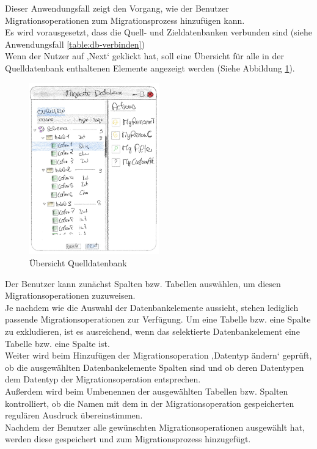 Dieser Anwendungsfall zeigt den Vorgang, wie der Benutzer Migrationsoperationen zum Migrationsprozess hinzufügen kann.\\
Es wird vorausgesetzt, dass die Quell- und Zieldatenbanken verbunden sind (siehe Anwendungsfall \ref{table:db-verbinden})\\
Wenn der Nutzer auf ,Next‘ geklickt hat, soll eine Übersicht für alle in der Quelldatenbank enthaltenen Elemente angezeigt werden (Siehe Abbildung \ref{img:overview}).
\begin{figure}[H]
	\centering
	\includegraphics[width=0.5\textwidth]{images/overview}
	\caption{Übersicht Quelldatenbank}
	\label{img:overview}
\end{figure}
Der Benutzer kann zunächst Spalten bzw. Tabellen auswählen, um diesen Migrationsoperationen zuzuweisen.\\
Je nachdem wie die Auswahl der Datenbankelemente aussieht, stehen lediglich passende Migrationsoperationen zur Verfügung. Um eine Tabelle bzw. eine Spalte zu exkludieren, ist es ausreichend, wenn das selektierte Datenbankelement eine Tabelle bzw. eine Spalte ist.\\
Weiter wird beim Hinzufügen der Migrationsoperation ‚Datentyp ändern‘ geprüft, ob die ausgewählten Datenbankelemente Spalten sind und ob deren Datentypen dem Datentyp der Migrationsoperation entsprechen.\\
Außerdem wird beim Umbenennen der ausgewählten Tabellen bzw. Spalten kontrolliert, ob die Namen mit dem in der Migrationsoperation gespeicherten regulären Ausdruck übereinstimmen. \\
Nachdem der Benutzer alle gewünschten Migrationsoperationen ausgewählt hat, werden diese gespeichert und zum Migrationsprozess hinzugefügt.

